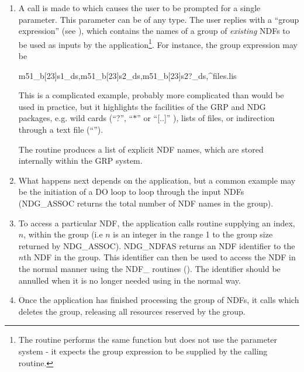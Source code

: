 \documentclass[twoside,11pt,nolof]{starlink}
\begin{document}
\begin{enumerate}

\item A call is made to  which causes the user
to be prompted for a single parameter. This parameter can be of any type.
The user replies with a ``group expression'' (see
), which contains the names of a group of \emph{existing} NDFs to be used as inputs by the application\footnote{The routine
 performs the same function but does not
use the parameter system - it expects the group expression to be supplied by
the calling routine.}. For instance, the group expression may be

\begin{terminalv}
m51_b[23]s1_ds,m51_b[23]s2_ds,m51_b[23]s2?_ds,^files.lis
\end{terminalv}

This is a complicated example, probably more complicated than would be
used in practice, but it highlights the facilities of the GRP and NDG
packages, e.g. wild cards (``?'', ``$*$'' or ``[..]'' ), lists of files,
or indirection through a text file (``\wedge'').

The  routine produces a list of explicit NDF names, which are stored
internally within the GRP system.

\item What happens next depends on the application, but a common example may be
the initiation of a DO loop to loop through the input NDFs (NDG\_ASSOC returns
the total number of NDF names in the group).

\item To access a particular NDF, the application calls routine 
supplying an index, $n$, within the group (i.e $n$ is an integer in the range 1
to the group size returned by NDG\_ASSOC). NDG\_NDFAS returns an NDF identifier
to the $n$th NDF in the group. This identifier can then be used to access the
NDF in the normal manner using the NDF\_ routines (). The identifier
should be annulled when it is no longer needed using  in the
normal way.

\item Once the application has finished processing the group of NDFs, it calls
 which deletes the group, releasing all resources reserved by the group.


\end{enumerate}
\end{document}
